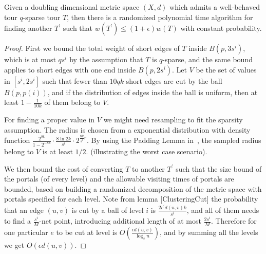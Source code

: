 \documentclass{llncs}
\begin{document}
\begin{lemma}
Given a doubling dimensional metric space $(X,d)$ which admits a well-behaved tour $q$-sparse tour $T$, then there is a randomized polynomial time algorithm for finding another $T^\prime$ such that $w(T^\prime)\leq(1+\epsilon)w(T)$ with constant probability.
\end{lemma}
\begin{proof}
First we bound the total weight of short edges of $T$ inside $B(p,3s^i)$, which is at most $qs^i$ by the assumption that $T$ is $q$-sparse, and the same bound applies to short edges with one end inside $B(p,2s^i)$.
Let $V$ be the set of values in $[s^i,2s^i]$ such that fewer than $10qk$ short edges are cut by the ball $B(p, p(i))$, and if the distribution of edges inside the ball is uniform, then at least $1-\frac{1}{10k}$ of them belong to $V$.

For finding a proper value in $V$ we might need resampling to fit the sparsity assumption.
The radius is chosen from a exponential distribution with density function $\frac{2^{8k}}{1-2^{-8k}}\cdot\frac{8\ln 2 k}{s^i}\cdot2^{\frac{8k}{s^i}r}$.
By using the Padding Lemma in~\cite{abn11}, the sampled radius belong to $V$ is at least $1/2$. (illustrating the worst case scenario).

We then bound the cost of converting $T$ to another $T^\prime$ such that the size bound of the portals (of every level) and the allowable visiting times of portals are bounded, based on building a randomized decomposition of the metric space with portals specified for each level.
Note from lemma [ClusteringCut] the probability that an edge $(u,v)$ is cut by a ball of level $i$ is $\frac{2c^\prime d(u,v)k}{s^i}$, and all of them needs to find a $\frac{s^i}{M}$-net point, introducing additional length of at most $\frac{2s^i}{M}$.
Therefore for one particular $e$ to be cut at level is $O(\frac{\epsilon d(u,v)}{\log_s n})$, and by summing all the levels we get $O(\epsilon d(u,v))$.


\end{proof}
\end{document}
